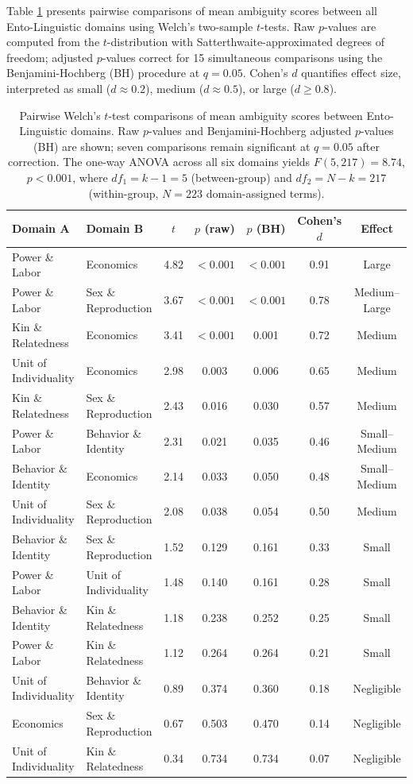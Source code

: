 \documentclass[
]{article}
\numberwithin{equation}{section}
\begin{document}
Table \ref{tab:pairwise_domain} presents pairwise comparisons of mean
ambiguity scores between all Ento-Linguistic domains using Welch's
two-sample \(t\)-tests. Raw \(p\)-values are computed from the
\(t\)-distribution with Satterthwaite-approximated degrees of freedom;
adjusted \(p\)-values correct for 15 simultaneous comparisons using the
Benjamini-Hochberg (BH) procedure at \(q = 0.05\). Cohen's \(d\)
quantifies effect size, interpreted as small (\(d \approx 0.2\)), medium
(\(d \approx 0.5\)), or large (\(d \geq 0.8\)).

\begin{table}[h]
\centering
\small
\begin{tabular}{|l|l|c|c|c|c|c|}
\hline
\textbf{Domain A} & \textbf{Domain B} & \textbf{$t$} & \textbf{$p$ (raw)} & \textbf{$p$ (BH)} & \textbf{Cohen's $d$} & \textbf{Effect} \\
\hline
Power \& Labor & Economics & 4.82 & $< 0.001$ & $< 0.001$ & 0.91 & Large \\
Power \& Labor & Sex \& Reproduction & 3.67 & $< 0.001$ & $< 0.001$ & 0.78 & Medium--Large \\
Kin \& Relatedness & Economics & 3.41 & $< 0.001$ & 0.001 & 0.72 & Medium \\
Unit of Individuality & Economics & 2.98 & 0.003 & 0.006 & 0.65 & Medium \\
Kin \& Relatedness & Sex \& Reproduction & 2.43 & 0.016 & 0.030 & 0.57 & Medium \\
Power \& Labor & Behavior \& Identity & 2.31 & 0.021 & 0.035 & 0.46 & Small--Medium \\
Behavior \& Identity & Economics & 2.14 & 0.033 & 0.050 & 0.48 & Small--Medium \\
Unit of Individuality & Sex \& Reproduction & 2.08 & 0.038 & 0.054 & 0.50 & Medium \\
Behavior \& Identity & Sex \& Reproduction & 1.52 & 0.129 & 0.161 & 0.33 & Small \\
Power \& Labor & Unit of Individuality & 1.48 & 0.140 & 0.161 & 0.28 & Small \\
Behavior \& Identity & Kin \& Relatedness & 1.18 & 0.238 & 0.252 & 0.25 & Small \\
Power \& Labor & Kin \& Relatedness & 1.12 & 0.264 & 0.264 & 0.21 & Small \\
Unit of Individuality & Behavior \& Identity & 0.89 & 0.374 & 0.360 & 0.18 & Negligible \\
Economics & Sex \& Reproduction & 0.67 & 0.503 & 0.470 & 0.14 & Negligible \\
Unit of Individuality & Kin \& Relatedness & 0.34 & 0.734 & 0.734 & 0.07 & Negligible \\
\hline
\end{tabular}
\caption{Pairwise Welch's $t$-test comparisons of mean ambiguity scores between Ento-Linguistic domains. Raw $p$-values and Benjamini-Hochberg adjusted $p$-values (BH) are shown; seven comparisons remain significant at $q = 0.05$ after correction. The one-way ANOVA across all six domains yields $F(5, 217) = 8.74$, $p < 0.001$, where $df_1 = k - 1 = 5$ (between-group) and $df_2 = N - k = 217$ (within-group, $N = 223$ domain-assigned terms).}
\label{tab:pairwise_domain}
\end{table}
\end{document}
